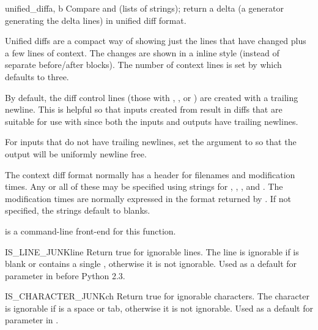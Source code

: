 \begin{funcdesc}{unified_diff}{a, b}
  Compare  and  (lists of strings); return a
  delta (a generator generating the delta lines) in unified diff
  format.

  Unified diffs are a compact way of showing just the lines that have
  changed plus a few lines of context.  The changes are shown in a
  inline style (instead of separate before/after blocks).  The number
  of context lines is set by  which defaults to three.

  By default, the diff control lines (those with \code{---}, \code{+++},
  or ) are created with a trailing newline.  This is helpful so
  that inputs created from  result in diffs
  that are suitable for use with  since both
  the inputs and outputs have trailing newlines.

  For inputs that do not have trailing newlines, set the 
  argument to  so that the output will be uniformly newline free.

  The context diff format normally has a header for filenames and
  modification times.  Any or all of these may be specified using strings for
  , , , and .
  The modification times are normally expressed in the format returned by
  .  If not specified, the strings default to blanks.

   is a command-line front-end for this
  function.

\end{funcdesc}

\begin{funcdesc}{IS_LINE_JUNK}{line}
  Return true for ignorable lines.  The line  is ignorable
  if  is blank or contains a single \character{\#},
  otherwise it is not ignorable.  Used as a default for parameter
   in  before Python 2.3.
\end{funcdesc}


\begin{funcdesc}{IS_CHARACTER_JUNK}{ch}
  Return true for ignorable characters.  The character  is
  ignorable if  is a space or tab, otherwise it is not
  ignorable.  Used as a default for parameter  in
  .
\end{funcdesc}


